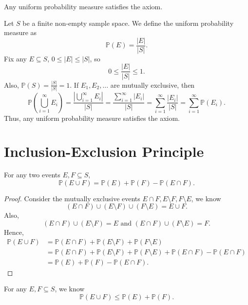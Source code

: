 \begin{eg}
    Any uniform probability measure satisfies the axiom.
\end{eg}
\begin{explanation}
    Let \(S\) be a finite non-empty sample space. We define the uniform probability measure as 
    \[
        \mathbb{P} (E) = \frac{\vert E \vert }{\vert S \vert }.
    \]  
    Fix any \(E \subseteq S\), \(0 \le \vert E \vert \le \vert S \vert  \), so 
    \[
        0 \le \frac{\vert E \vert }{\vert S \vert } \le 1.
    \]
    Also, \(\mathbb{P} (S) = \frac{\vert S \vert }{\vert S \vert } = 1\). If \(E_1, E_2, \dots \) are mutually exclusive, then 
    \[
        \mathbb{P} \left( \bigcup_{i=1}^{\infty} E_i  \right) = \frac{\left\vert \bigcup_{i=1}^{\infty} E_i  \right\vert }{\vert S \vert } = \frac{\sum_{i=1}^{\infty} \vert E_i \vert  }{\vert S \vert } = \sum_{i=1}^{\infty} \frac{\vert E_i \vert }{\vert S \vert } = \sum_{i=1}^{\infty} \mathbb{P} (E_i).  
    \]  
    Thus, any uniform probability measure satisfies the axiom.
\end{explanation}

\section{Inclusion-Exclusion Principle}

\begin{proposition}
    For any two events \(E, F \subseteq S\), 
    \[
        \mathbb{P} (E \cup F) = \mathbb{P} (E) + \mathbb{P} (F) - \mathbb{P} (E \cap F).
    \] 
\end{proposition}
\begin{proof}
    Consider the mutually exclusive events \(E \cap F, E \setminus F, F \setminus E\), we know 
    \[
        \left( E \cap F \right) \cup \left( E \setminus F \right) \cup \left( F \setminus E \right) = E \cup F.   
    \] 
    Also, 
    \[
        (E \cap F) \cup (E \setminus F) = E \text{ and } (E \cap F) \cup (F \setminus E) = F. 
    \]
    Hence, 
    \begin{align*}
        \mathbb{P} (E \cup F) &= \mathbb{P} (E \cap F) + \mathbb{P} (E \setminus F) + \mathbb{P} (F \setminus E) \\
        &= \mathbb{P} (E \cap F) + \mathbb{P} (E \setminus F) + \mathbb{P} (F \setminus E) + \mathbb{P} (E \cap F) - \mathbb{P} (E \cap F) \\
        &= \mathbb{P} (E) + \mathbb{P} (F) - \mathbb{P} (E \cap F).
    \end{align*}
\end{proof}

\begin{corollary}
    For any \(E, F \subseteq S\), we know 
    \[
        \mathbb{P} (E \cup F) \le \mathbb{P} (E) + \mathbb{P} (F).
    \] 
\end{corollary}